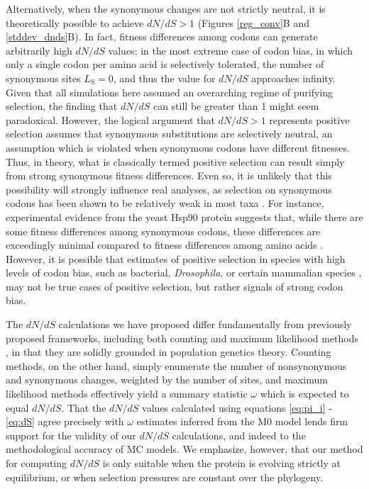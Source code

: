 \documentclass{pnastwo}
\begin{document}
\begin{article}
Alternatively, when the synonymous changes are not strictly neutral, it is theoretically possible to achieve $dN/dS > 1$ (Figures \ref{reg_conv}B and \ref{stddev_dnds}B). In fact, fitness differences among codons can generate arbitrarily high $dN/dS$ values; in the most extreme case of codon bias, in which only a single codon per amino acid is selectively tolerated, the number of synonymous sites $L_\text{S} = 0$, and thus the value for $dN/dS$ approaches infinity. Given that all simulations here assumed an overarching regime of purifying selection, the finding that $dN/dS$ can still be greater than 1 might seem paradoxical. However, the logical argument that $dN/dS > 1$ represents positive selection assumes that synonymous substitutions are selectively neutral, an assumption which is violated when synonymous codons have different fitnesses. Thus, in theory, what is classically termed positive selection can result simply from strong synonymous fitness differences. Even so, it is unlikely that this possibility will strongly influence real analyses, as selection on synonymous codons has been shown to be relatively weak in most taxa \cite{HershbergPetrov2008}. For instance, experimental evidence from the yeast Hsp90 protein suggests that, while there are some fitness differences among synonymous codons, these differences are exceedingly minimal compared to fitness differences among amino acids \cite{Hietpas2011,Hietpas2013}. However, it is possible that estimates of positive selection in species with high levels of codon bias, such as bacterial, \textit{Drosophila}, or certain mammalian species \cite{Duret2002, Chamaryetal2006, PlotkinKudla2010}, may not be true cases of positive selection, but rather signals of strong codon bias.
		
The $dN/dS$ calculations we have proposed differ fundamentally from previously proposed frameworks, including both counting \cite{LWL85,NG86,Pamilo1993,Ina1995,YN00} and maximum likelihood methods \cite{GoldmanYang1994,MuseGaut1994,Yang2006,Anisimova2009}, in that they are solidly grounded in population genetics theory. Counting methods, on the other hand, simply enumerate the number of nonsynonymous and synonymous changes, weighted by the number of sites, and maximum likelihood methods effectively yield a summary statistic $\omega$ which is expected to equal $dN/dS$. That the $dN/dS$ values calculated using equations \eqref{eq:pi_i} - \eqref{eq:dS} agree precisely with $\omega$ estimates inferred from the M0 model lends firm support for the validity of our $dN/dS$ calculations, and indeed to the methodological accuracy of MC models. We emphasize, however, that our method for computing $dN/dS$ is only suitable when the protein is evolving strictly at equilibrium, or when selection pressures are constant over the phylogeny.
		

\end{article}
\end{document}

